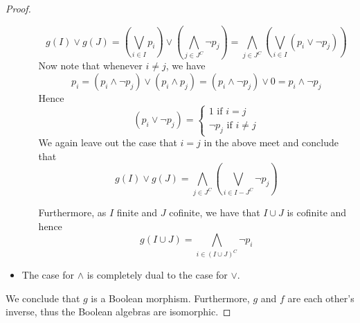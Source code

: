 \documentclass{../util/zariski-small}
\begin{document}
\begin{example}
\begin{proof}
\begin{itemize}
\begin{itemize}
        \begin{equation}
        g(I) \vee g(J) = (\bigvee_{i\in I} p_i) \vee (\bigwedge_{j \in J^C} \neg p_j)
        = \bigwedge_{j \in J^C} (\bigvee_{i \in I}( p_i \vee \neg p_j))
        \end{equation}
        Now note that 
        whenever $i\neq j$, we have 
        \begin{equation}
          p_i = (p_i \wedge \neg p_j) \vee (p_i \wedge p_j) = 
          (p_i \wedge \neg p_j) \vee 0 = p_i \wedge \neg p_j
        \end{equation}
        Hence 
        \begin{equation} 
          (p_i \vee \neg p_j)  =
            \begin{cases}
              1 \text{ if } i = j \\
              \neg p_j \text{ if } i \neq j
            \end{cases}
        \end{equation}
        We again leave out the case that $i = j$ in the above meet and conclude that 
        \begin{equation}
        g(I) \vee g(J) 
        = \bigwedge_{j \in J^C} (\bigvee_{i \in I-J^C}\neg p_j)
        \end{equation}

        Furthermore, as $I$ finite and $J$ cofinite, we have that $I \cup J$ is cofinite and hence 
        \begin{equation}
          g(I \cup J) = \bigwedge_{i \in (I \cup J)^C} \neg p_i
        \end{equation}

      \end{itemize}
    \item The case for $\wedge$ is completely dual to the case for $\vee$. 
  \end{itemize}
We conclude that $g$ is a Boolean morphism. 
Furthermore, $g$ and $f$ are each other's inverse, thus the Boolean algebras are isomorphic. 
\end{proof}
\end{example}
\end{document}
